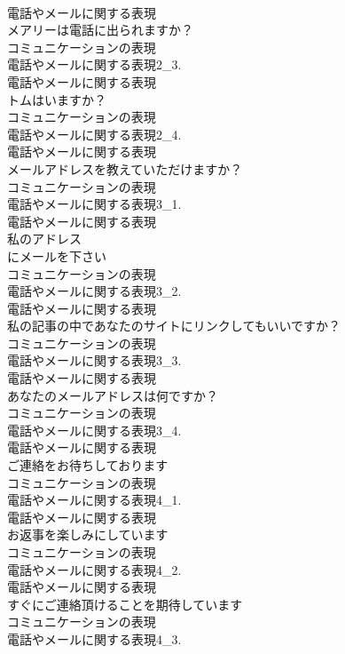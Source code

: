 \documentclass[8pt]{extreport}
\begin{document}
\begin{CJK}{UTF8}{min}
\\	電話やメールに関する表現
\\	メアリーは電話に出られますか？	
\\	コミュニケーションの表現
\\	電話やメールに関する表現2_3.
\\	電話やメールに関する表現
\\	トムはいますか？	
\\	コミュニケーションの表現
\\	電話やメールに関する表現2_4.
\\	電話やメールに関する表現
\\	メールアドレスを教えていただけますか？	
\\	コミュニケーションの表現
\\	電話やメールに関する表現3_1.
\\	電話やメールに関する表現
\\	私のアドレス
\\	にメールを下さい	
\\	コミュニケーションの表現
\\	電話やメールに関する表現3_2.
\\	電話やメールに関する表現
\\	私の記事の中であなたのサイトにリンクしてもいいですか？	
\\	コミュニケーションの表現
\\	電話やメールに関する表現3_3.
\\	電話やメールに関する表現
\\	あなたのメールアドレスは何ですか？	
\\	コミュニケーションの表現
\\	電話やメールに関する表現3_4.
\\	電話やメールに関する表現
\\	ご連絡をお待ちしております	
\\	コミュニケーションの表現
\\	電話やメールに関する表現4_1.
\\	電話やメールに関する表現
\\	お返事を楽しみにしています	
\\	コミュニケーションの表現
\\	電話やメールに関する表現4_2.
\\	電話やメールに関する表現
\\	すぐにご連絡頂けることを期待しています	
\\	コミュニケーションの表現
\\	電話やメールに関する表現4_3.

\end{CJK}
\end{document}
